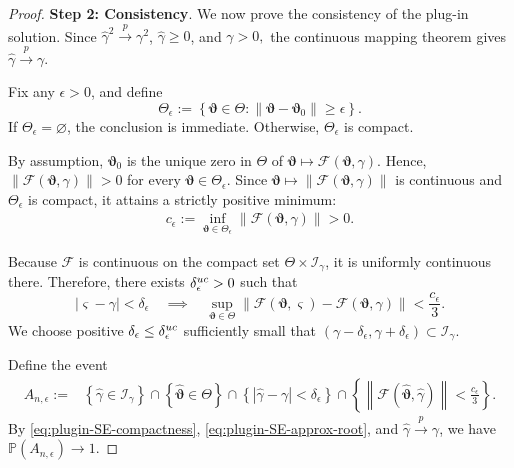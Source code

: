 \documentclass[10pt,a4paper]{amsart}
\newcommand{\pconv}{\overset{{p}}{\to}}
\newcommand{\pr}{\mathbb{P}}
\renewcommand{\hat}{\widehat}
\begin{document}
\begin{proof}
\textbf{Step 2: Consistency}. 
We now prove the consistency of the plug-in solution. Since $\hat\gamma^2\pconv\gamma^2$, $\hat\gamma\ge0$, and $\gamma>0,$
the continuous mapping theorem gives
$\hat\gamma\pconv\gamma.$

Fix any $\epsilon>0$, and define
\[
\Theta_\epsilon
:=
\left\{
\bm\vartheta\in\Theta:
\|\bm\vartheta-\bm\vartheta_0\|\ge\epsilon
\right\}.
\]
If $\Theta_\epsilon=\varnothing$, the conclusion is immediate. Otherwise,
$\Theta_\epsilon$ is compact.

By assumption, $\bm\vartheta_0$ is the unique zero in $\Theta$ of $\bm\vartheta
\mapsto
\mathcal F(\bm\vartheta,\gamma).$
Hence, $\|\mathcal F(\bm\vartheta,\gamma)\|>0$ for every $\bm\vartheta\in\Theta_\epsilon.$
Since
$\bm\vartheta\mapsto
\|\mathcal F(\bm\vartheta,\gamma)\|$
is continuous and $\Theta_\epsilon$ is compact, it attains a strictly
positive minimum:
\begin{align}
c_\epsilon
:=
\inf_{\bm\vartheta\in\Theta_\epsilon}
\|\mathcal F(\bm\vartheta,\gamma)\|
>0.
\label{eq:SE-root-separation}
\end{align}

Because $\mathcal F$ is continuous on the compact set
$\Theta\times\mathcal I_\gamma$, it is uniformly continuous there.
Therefore, there exists $\delta_\epsilon^{\rm uc}>0$ such that
\[
|\varsigma-\gamma|<\delta_\epsilon
\quad\implies\quad
\sup_{\bm\vartheta\in\Theta}
\left\|
\mathcal F(\bm\vartheta,\varsigma)
-
\mathcal F(\bm\vartheta,\gamma)
\right\|
<
\frac{c_\epsilon}{3}.
\]
We choose positive $\delta_\epsilon\le\delta_\epsilon^{\rm uc}$ sufficiently small that $(\gamma-\delta_\epsilon,\gamma+\delta_\epsilon)
\subset\mathcal I_\gamma.$

Define the event
\begin{align}
A_{n,\epsilon}
:=
&
\left\{
\hat\gamma\in\mathcal I_\gamma
\right\}
\cap
\left\{
\hat{\bm\vartheta}\in\Theta
\right\}
\cap
\left\{
|\hat\gamma-\gamma|<\delta_\epsilon
\right\}
\cap
\left\{
\left\|
\mathcal F(\hat{\bm\vartheta},\hat\gamma)
\right\|
<
\frac{c_\epsilon}{3}
\right\}.
\label{eq:SE-consistency-event}
\end{align}
By \eqref{eq:plugin-SE-compactness},
\eqref{eq:plugin-SE-approx-root}, and
$\hat\gamma\pconv\gamma$, we have $\pr(A_{n,\epsilon})\rightarrow1.$


\end{proof}
\end{document}
